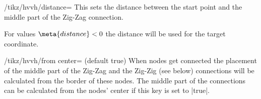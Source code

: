 \begin{key}{/tikz/hvvh/distance=}
  This sets the distance between the start point
  and the middle part of the Zig-Zag connection.
  
  For values $\meta{distance} < 0$ the distance will be used for the target coordinate.
\begin{codeexample}[width=8cm,preamble=\usetikzlibrary{ext.paths.ortho}]
\end{codeexample}
\end{key}
\begin{key}{/tikz/hvvh/from center= (default true)}
  When nodes get connected the placement of the middle part of the Zig-Zag
  and the Zig-Zig (see below) connections will be calculated from the border
  of these nodes.
  The middle part of the connections can be calculated from the nodes' center
  if this key is set to |true|.
\end{key}

